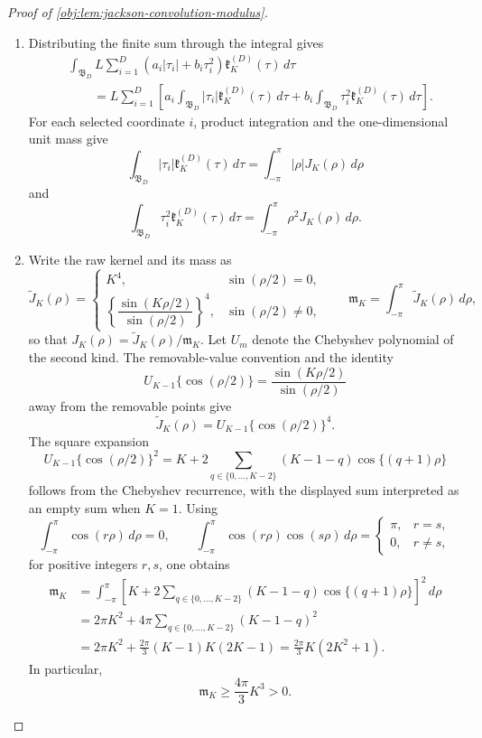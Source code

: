 \documentclass[11pt]{article}
\begin{document}
\begin{proof}[Proof of \cref{obj:lem:jackson-convolution-modulus}]
\begin{enumerate}
\item Distributing the finite sum through the integral gives
\[
\begin{aligned}
&\int_{\mathfrak B_D}
L\sum_{i=1}^D\left(a_i|\tau_i|+b_i\tau_i^2\right)
\mathfrak k_K^{(D)}(\tau)\,d\tau  \\
&\qquad =
L\sum_{i=1}^D
\left[
a_i\int_{\mathfrak B_D}|\tau_i|\mathfrak k_K^{(D)}(\tau)\,d\tau
+
b_i\int_{\mathfrak B_D}\tau_i^2\mathfrak k_K^{(D)}(\tau)\,d\tau
\right].
\end{aligned}
\]
For each selected coordinate \(i\), product integration and the one-dimensional unit mass give
\[
\int_{\mathfrak B_D}|\tau_i|\mathfrak k_K^{(D)}(\tau)\,d\tau
=
\int_{-\pi}^{\pi}|\rho|J_K(\rho)\,d\rho
\]
and
\[
\int_{\mathfrak B_D}\tau_i^2\mathfrak k_K^{(D)}(\tau)\,d\tau
=
\int_{-\pi}^{\pi}\rho^2J_K(\rho)\,d\rho .
\] %

\item Write the raw kernel and its mass as
\[
\widetilde J_K(\rho)=
\begin{cases}
K^4, & \sin(\rho/2)=0,\\[2mm]
\left\{\dfrac{\sin(K\rho/2)}{\sin(\rho/2)}\right\}^4,
& \sin(\rho/2)\ne0,
\end{cases}
\qquad
\mathfrak m_K=\int_{-\pi}^{\pi}\widetilde J_K(\rho)\,d\rho,
\]
so that \(J_K(\rho)=\widetilde J_K(\rho)/\mathfrak m_K\). Let \(U_m\) denote the Chebyshev polynomial of the second kind. The removable-value convention and the identity
\[
U_{K-1}\{\cos(\rho/2)\}
=
\frac{\sin(K\rho/2)}{\sin(\rho/2)}
\]
away from the removable points give
\[
\widetilde J_K(\rho)
=
U_{K-1}\{\cos(\rho/2)\}^4 .
\]
The square expansion
\[
U_{K-1}\{\cos(\rho/2)\}^2
=
K+2\sum_{q\in\{0,\ldots,K-2\}}(K-1-q)\cos\{(q+1)\rho\}
\]
follows from the Chebyshev recurrence, with the displayed sum interpreted as an empty sum when \(K=1\). Using
\[
\int_{-\pi}^{\pi}\cos(r\rho)\,d\rho=0,
\qquad
\int_{-\pi}^{\pi}\cos(r\rho)\cos(s\rho)\,d\rho
=
\begin{cases}
\pi,& r=s,\\
0,& r\ne s,
\end{cases}
\]
for positive integers \(r,s\), one obtains
\[
\begin{aligned}
\mathfrak m_K
&=
\int_{-\pi}^{\pi}
\left[
K+2\sum_{q\in\{0,\ldots,K-2\}}(K-1-q)\cos\{(q+1)\rho\}
\right]^2\,d\rho  \\
&=
2\pi K^2+4\pi\sum_{q\in\{0,\ldots,K-2\}}(K-1-q)^2  \\
&=
2\pi K^2+\frac{2\pi}{3}(K-1)K(2K-1)
=
\frac{2\pi}{3}K(2K^2+1).
\end{aligned}
\]
In particular,
\[
\mathfrak m_K\ge \frac{4\pi}{3}K^3>0 .
\] %


\end{enumerate}
\end{proof}
\end{document}
